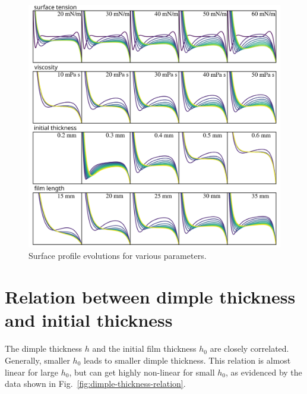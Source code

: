 \documentclass[aps,preprint]{revtex4-2}
\begin{document}
\begin{figure}[ht]
    \centering
    \includegraphics[width=\linewidth]{Figures/all_parameter_effects.png}
    \caption{
    Surface profile evolutions for various parameters.
    }
    \label{fig:all-parameters-influence}
\end{figure}

\newpage

\section{Relation between dimple thickness and initial thickness}

The dimple thickness $h$ and the initial film thickness $h_0$ are closely correlated. 
Generally, smaller $h_0$ leads to smaller dimple thickness. 
This relation is almost linear for large $h_0$, but can get highly non-linear for small $h_0$, as evidenced by the data shown in Fig.~\ref{fig:dimple-thickness-relation}.
\end{document}
